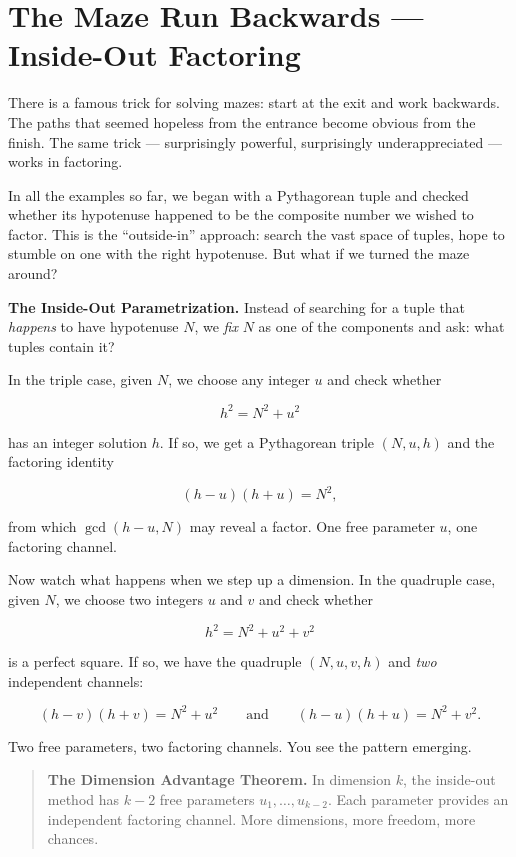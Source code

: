 \section{The Maze Run Backwards --- Inside-Out Factoring}\label{ch6-the-maze-run-backwards-inside-out-factoring}

There is a famous trick for solving mazes: start at the exit and work backwards. The paths that seemed hopeless from the entrance become obvious from the finish. The same trick --- surprisingly powerful, surprisingly underappreciated --- works in factoring.

In all the examples so far, we began with a Pythagorean tuple and checked whether its hypotenuse happened to be the composite number we wished to factor. This is the ``outside-in'' approach: search the vast space of tuples, hope to stumble on one with the right hypotenuse. But what if we turned the maze around?

\textbf{The Inside-Out Parametrization.} Instead of searching for a tuple that \emph{happens} to have hypotenuse \(N\), we \emph{fix} \(N\) as one of the components and ask: what tuples contain it?

In the triple case, given \(N\), we choose any integer \(u\) and check whether

\[h^2 = N^2 + u^2\]

has an integer solution \(h\). If so, we get a Pythagorean triple \((N, u, h)\) and the factoring identity

\[(h - u)(h + u) = N^2,\]

from which \(\gcd(h - u, N)\) may reveal a factor. One free parameter \(u\), one factoring channel.

Now watch what happens when we step up a dimension. In the quadruple case, given \(N\), we choose two integers \(u\) and \(v\) and check whether

\[h^2 = N^2 + u^2 + v^2\]

is a perfect square. If so, we have the quadruple \((N, u, v, h)\) and \emph{two} independent channels:

\[(h - v)(h + v) = N^2 + u^2 \qquad \text{and} \qquad (h - u)(h + u) = N^2 + v^2.\]

Two free parameters, two factoring channels. You see the pattern emerging.

\begin{quote}
\textbf{The Dimension Advantage Theorem.} In dimension \(k\), the inside-out method has \(k - 2\) free parameters \(u_1, \ldots, u_{k-2}\). Each parameter provides an independent factoring channel. More dimensions, more freedom, more chances.
\end{quote}

